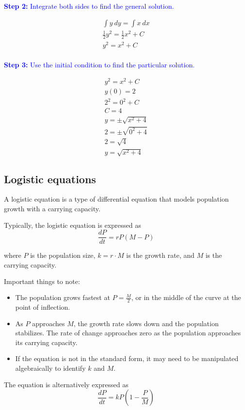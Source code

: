 \documentclass[letterpaper, 12pt]{article}
\newcommand{\step}[2]{\textcolor{blue}{\textbf{Step #1:} #2}}
\begin{document}
\step{2}{Integrate both sides to find the general solution.}

\begin{gather*}
\int y \: dy = \int x \: dx \\
\frac{1}{2} y^2 = \frac{1}{2} x^2 + C \\
y^2 = x^2 + C \\
\end{gather*}

\step{3}{Use the initial condition to find the particular solution.}

\begin{gather*}
y^2 = x^2 + C\\
y(0) = 2 \\
2^2 = 0^2 + C \\
C = 4 \\
y = \pm \sqrt{x^2+4} \\
2 = \pm \sqrt{0^2 + 4} \\
2 = \sqrt{4} \\
\boxed{y = \sqrt{x^2 + 4}}
\end{gather*}

\subsection*{Logistic equations}

A logistic equation is a type of differential equation that models population growth with a carrying capacity.

Typically, the logistic equation is expressed as $$\frac{dP}{dt} = rP(M-P)$$

where $P$ is the population size, $k = r \cdot M$ is the growth rate, and $M$ is the carrying capacity.

Important things to note:
\begin{itemize}
\item The population grows fastest at $P = \displaystyle \frac{M}{2}$, or in the middle of the curve at the point of inflection.
\item As $P$ approaches $M$, the growth rate slows down and the population stabilizes. The rate of change approaches zero as the population approaches its carrying capacity.
\item If the equation is not in the standard form, it may need to be manipulated algebraically to identify $k$ and $M$.
\end{itemize}

The equation is alternatively expressed as $$\frac{dP}{dt} = kP\left(1 - \frac{P}{M}\right)$$
\end{document}
